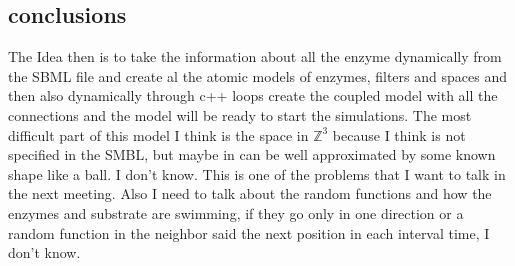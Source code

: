 \documentclass[12pt]{article}
\begin{document}
\subsection*{conclusions}

The Idea then is to take the information about all the enzyme dynamically from the SBML file and create al the atomic models of enzymes, filters and spaces and then also dynamically through c++ loops create the coupled model with all the connections and the model will be ready to start the simulations.
The most difficult part of this model I think is the space in $\mathbb{Z}^3$ because I think is not specified in the SMBL, but maybe in can be well approximated by some known shape like a ball. I don't know. This is one of the problems that I want to talk in the next meeting. Also I need to talk about the random functions and how the enzymes and substrate are swimming, if they go only in one direction or a random function in the neighbor said the next position in each interval time, I don't know.
\end{document}
